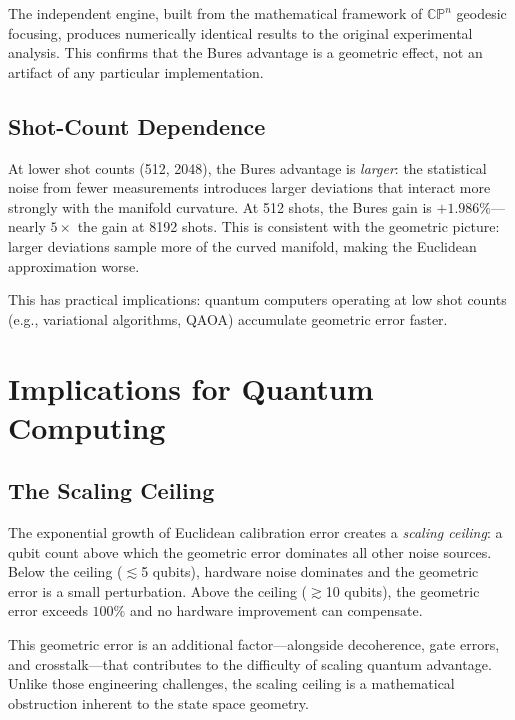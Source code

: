 \documentclass[12pt,a4paper]{article}
\begin{document}
The independent engine, built from the mathematical framework of $\mathbb{CP}^n$ geodesic focusing, produces numerically identical results to the original experimental analysis. This confirms that the Bures advantage is a geometric effect, not an artifact of any particular implementation.

\subsection{Shot-Count Dependence}

At lower shot counts (512, 2048), the Bures advantage is \textit{larger}: the statistical noise from fewer measurements introduces larger deviations that interact more strongly with the manifold curvature. At 512 shots, the Bures gain is $+1.986\%$---nearly $5\times$ the gain at 8192 shots. This is consistent with the geometric picture: larger deviations sample more of the curved manifold, making the Euclidean approximation worse.

This has practical implications: quantum computers operating at low shot counts (e.g., variational algorithms, QAOA) accumulate geometric error faster.

\section{Implications for Quantum Computing}
\label{sec:implications}

\subsection{The Scaling Ceiling}

The exponential growth of Euclidean calibration error creates a \textit{scaling ceiling}: a qubit count above which the geometric error dominates all other noise sources. Below the ceiling ($\lesssim$5 qubits), hardware noise dominates and the geometric error is a small perturbation. Above the ceiling ($\gtrsim$10 qubits), the geometric error exceeds $100\%$ and no hardware improvement can compensate.

This geometric error is an additional factor---alongside decoherence, gate errors, and crosstalk---that contributes to the difficulty of scaling quantum advantage. Unlike those engineering challenges, the scaling ceiling is a mathematical obstruction inherent to the state space geometry.
\end{document}
